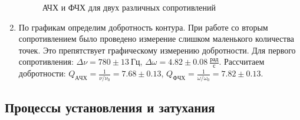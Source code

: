 \documentclass[14pt, a4paper]{report}
\begin{document}
\begin{enumerate}
\begin{figure}[H]
\centering
{}
\caption{АЧХ и ФЧХ для двух различных сопротивлений}
\end{figure}

\item По графикам определим добротность контура. При работе со вторым сопротивлением было проведено измерение слишком маленького количества точек. Это препятствует графическому измерению добротности. Для первого сопротивления: $\Delta\nu=780\pm13\ Гц$, $\Delta\omega=4.82\pm0.08\ \frac{рад}{с}$. Рассчитаем добротности: $Q_{АЧХ}=\frac{1}{\nu/\nu_0}=7.68\pm0.13$, $Q_{ФЧХ}=\frac{1}{\omega/\omega_0}=7.82\pm0.13$.

\end{enumerate}

\subsection{Процессы установления и затухания}
\end{document}

